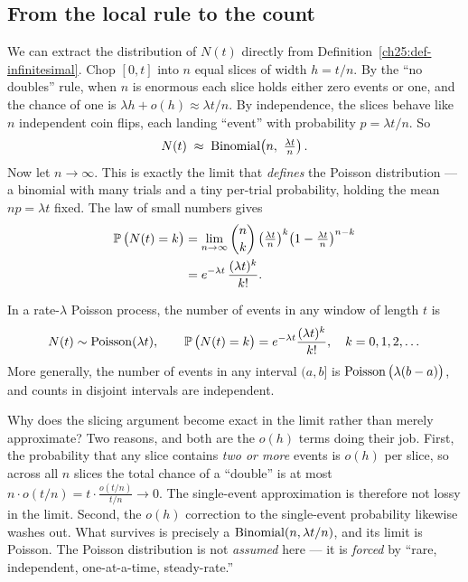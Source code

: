 \subsection{From the local rule to the count}

We can extract the distribution of $N(t)$ directly from
Definition~\ref{ch25:def-infinitesimal}. Chop $[0,t]$ into $n$ equal slices of
width $h = t/n$. By the ``no doubles'' rule, when $n$ is enormous each slice
holds either zero events or one, and the chance of one is $\lambda h + o(h)
\approx \lambda t / n$. By independence, the slices behave like $n$ independent
coin flips, each landing ``event'' with probability $p = \lambda t/n$. So
\[
N(t) \;\approx\; \Bin\!\left(n,\ \tfrac{\lambda t}{n}\right).
\]
Now let $n \to \infty$. This is exactly the limit that \emph{defines} the Poisson
distribution --- a binomial with many trials and a tiny per-trial probability,
holding the mean $np = \lambda t$ fixed. The law of small numbers gives
\begin{align*}
\P\big(N(t) = k\big) &= \lim_{n\to\infty}\binom{n}{k}
\left(\tfrac{\lambda t}{n}\right)^{k}\!\left(1-\tfrac{\lambda t}{n}\right)^{n-k} \\
&= e^{-\lambda t}\,\frac{(\lambda t)^{k}}{k!}.
\end{align*}

\begin{theorem}
\label{ch25:thm-counts-poisson}
In a rate-$\lambda$ Poisson process, the number of events in any window of length
$t$ is
\[
N(t) \sim \Pois(\lambda t), \qquad
\P\big(N(t)=k\big) = e^{-\lambda t}\frac{(\lambda t)^k}{k!}, \quad k=0,1,2,\dots
\]
More generally, the number of events in any interval $(a,b]$ is
$\Pois\big(\lambda(b-a)\big)$, and counts in disjoint intervals are independent.
\end{theorem}

\begin{whybox}
Why does the slicing argument become exact in the limit rather than merely
approximate? Two reasons, and both are the $o(h)$ terms doing their job. First,
the probability that any slice contains \emph{two or more} events is $o(h)$ per
slice, so across all $n$ slices the total chance of a ``double'' is at most
$n\cdot o(t/n) = t\cdot \frac{o(t/n)}{t/n} \to 0$. The single-event approximation
is therefore not lossy in the limit. Second, the $o(h)$ correction to the
single-event probability likewise washes out. What survives is precisely a
$\Bin(n, \lambda t/n)$, and its limit is Poisson. The Poisson distribution is not
\emph{assumed} here --- it is \emph{forced} by ``rare, independent, one-at-a-time,
steady-rate.''
\end{whybox}

